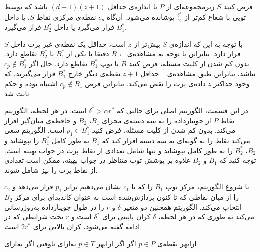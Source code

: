 

فرض کنید $S$ زیرمجموعه‌ای از $P$ با اندازه‌ی حداقل $(d+1)(z+1)$ باشد که توسط توپی با شعاع کم‌تر از $\frac{\delta^*}{2}$ پوشانده می‌شود. آن‌گاه $c_p$ نقطه‌ی مرکزی نقاط $S$، یا داخل $B_1^*$ قرار می‌گیرد یا داخل $B_2^*$ قرار می‌گیرد.


با توجه به این که اندازه‌ی $S$ بیش‌تر از $z$ است، حداقل یک نقطه‌ی غیر پرت داخل $S$ قرار دارد. بنابراین با توجه به مشاهده‌ی ~، $B$ دقیقا با یکی از $B_1^*$ یا $B_2^*$ تقاطع دارد. بدون کم شدن از کلیت مسئله، فرض کنید $B$ با توپ $B_1^*$ تقاطع دارد. حال اگر $c_p \not \in B_1^*$ نباشد، بنابراین طبق مشاهده‌ی ~ حداقل $ z+1$ نقطه‌ی دیگر خارج $B_1^*$ قرار می‌گیرند، که وجود حداکثر $z$ داده‌ی پرت را نقض می‌کند. بنابراین فرض $c_p \not \in B_1$ اشتباه بوده و حکم ثابت شد.




در این قسمت، الگوریتم اصلی برای حالتی که $\delta^* > \alpha r^*$ است. در هر لحظه، الگوریتم نقاط $P$ از جویبارداده را به سه دسته‌ی مجزای $B_1$، $B_2$ و حافظه‌ی میان‌گیر  افراز می‌کند. بدون کم شدن از کلیت مسئله، فرض کنید $p_1 \in B_1^*$ است. الگوریتم سعی می‌کند نقا‌ط را به گونه‌ای به سه دسته افراز کند که $B_1$ به طور کامل $B_1^*$ را بپوشاند و $B_2$، $B_2^*$ را به طور کامل بپوشاند و  تنها شامل تعدادی از نقاط پرت در جواب بهینه است. توجه کنید که $B_1$ و $B_2$ علاوه بر پوشش توپ متناظر در جواب بهینه، ممکن است تعدادی از نقاط پرت را نیز شامل شوند. 

با شروع الگوریتم، مرکز توپ $B_1$ را که با $c_1$ نشان می‌دهیم برابر $p_1$ قرار می‌دهد و $c_2$ را از میان نقاطی که تا کنون پردازش‌شده است به عنوان کاندیدای برای مرکز $B_2$ انتخاب می‌کند. الگوریتم همچنین دو متغیر $\delta$ و $r$ را در طول جویبارداده به‌روزرسانی می‌کند به طوری که در هر لحظه، $\delta$ کران پایینی برای $\delta^*$ است و $r$ تحت شرایطی که در ادامه گفته می‌شود، کران بالایی برای $2r^*$ است.
 
‌ازای{هر نقطه‌ی $p \in P$}
‌اگر{}
‌اگر{}
‌ازای{هر $p \in T$}
‌به‌ازای{}
‌تاوقتی{}
‌اگر{}
‌به‌ازای{}

